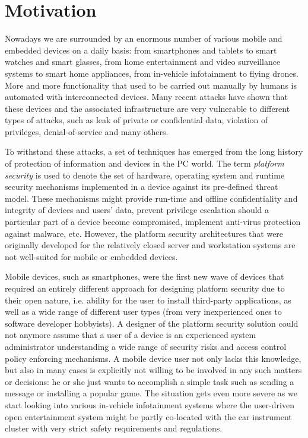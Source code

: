
\section{Motivation}

Nowadays we are surrounded by an enormous number of various mobile and embedded devices on a daily basis: from smartphones and tablets to smart watches and smart glasses, from home entertainment and video surveillance systems to smart home appliances, from in-vehicle infotainment to flying drones. More and more functionality that used to be carried out manually by humans is automated with interconnected devices. Many recent attacks have shown that these devices and the associated infrastructure are very vulnerable to different types of attacks, such as leak of private or confidential data, violation of privileges, denial-of-service and many others. 

To withstand these attacks, a set of techniques has emerged from the long history of protection of information and devices in the PC world. The term \textit{platform security} is used to denote the set of hardware, operating system and runtime security mechanisms implemented in a device against its pre-defined threat model. These mechanisms might provide run-time and offline confidentiality and integrity of devices and users' data, prevent privilege escalation should a particular part of a device become compromised, implement anti-virus protection against malware, etc. However, the platform security architectures that were originally developed for the relatively closed server and workstation systems are not well-suited for mobile or embedded devices. 

Mobile devices, such as smartphones, were the first new wave of devices that required an entirely different approach for designing platform security due to their open nature, i.e. ability for the user to install third-party applications, as well as a wide range of different user types (from very inexperienced ones to software developer hobbyists). A designer of the platform security solution could not anymore assume that a user of a device is an experienced system administrator understanding a wide range of security risks and access control policy enforcing mechanisms. A mobile device user not only lacks this knowledge, but also in many cases is explicitly not willing to be involved in any such matters or decisions: he or she just wants to accomplish a simple task such as sending a message or installing a popular game. The situation gets even more severe as we start looking into various in-vehicle infotainment systems where the user-driven open entertainment system might be partly co-located with the car instrument cluster with very strict safety requirements and regulations. 


